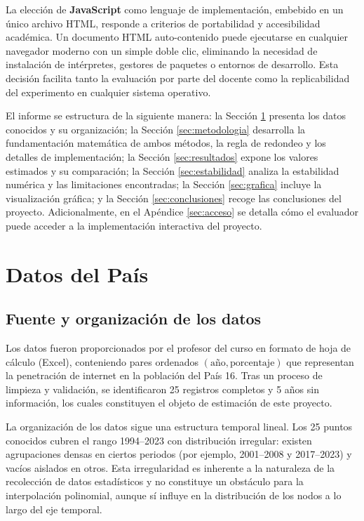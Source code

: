 \documentclass[12pt, letterpaper]{article}
\begin{document}
La elección de \textbf{JavaScript} como lenguaje de implementación, embebido en un único archivo HTML, responde a criterios de portabilidad y accesibilidad académica. Un documento HTML auto-contenido puede ejecutarse en cualquier navegador moderno con un simple doble clic, eliminando la necesidad de instalación de intérpretes, gestores de paquetes o entornos de desarrollo. Esta decisión facilita tanto la evaluación por parte del docente como la replicabilidad del experimento en cualquier sistema operativo.

El informe se estructura de la siguiente manera: la Sección \ref{sec:datos} presenta los datos conocidos y su organización; la Sección \ref{sec:metodologia} desarrolla la fundamentación matemática de ambos métodos, la regla de redondeo y los detalles de implementación; la Sección \ref{sec:resultados} expone los valores estimados y su comparación; la Sección \ref{sec:estabilidad} analiza la estabilidad numérica y las limitaciones encontradas; la Sección \ref{sec:grafica} incluye la visualización gráfica; y la Sección \ref{sec:conclusiones} recoge las conclusiones del proyecto. Adicionalmente, en el Apéndice \ref{sec:acceso} se detalla cómo el evaluador puede acceder a la implementación interactiva del proyecto.

\section{Datos del País}\label{sec:datos}

\subsection{Fuente y organización de los datos}\label{subsec:fuente}

Los datos fueron proporcionados por el profesor del curso en formato de hoja de cálculo (Excel), conteniendo pares ordenados $(\text{año}, \text{porcentaje})$ que representan la penetración de internet en la población del País 16. Tras un proceso de limpieza y validación, se identificaron 25 registros completos y 5 años sin información, los cuales constituyen el objeto de estimación de este proyecto.

La organización de los datos sigue una estructura temporal lineal. Los 25 puntos conocidos cubren el rango 1994--2023 con distribución irregular: existen agrupaciones densas en ciertos periodos (por ejemplo, 2001--2008 y 2017--2023) y vacíos aislados en otros. Esta irregularidad es inherente a la naturaleza de la recolección de datos estadísticos y no constituye un obstáculo para la interpolación polinomial, aunque sí influye en la distribución de los nodos a lo largo del eje temporal.
\end{document}
